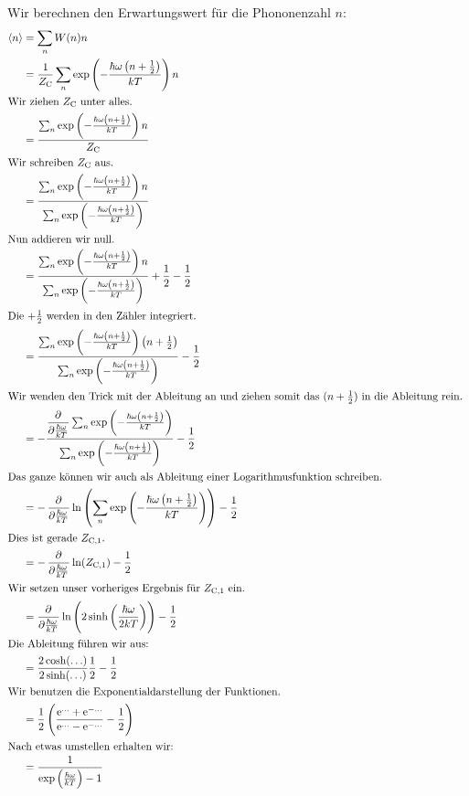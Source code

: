 Wir berechnen den Erwartungswert für die Phononenzahl $n$:
\begin{align*}
    \bracket n
    &= \sum_n W(n) n \\
    &= \frac1\ZC \sum_n \exp\del{-\frac{\hbar \omega \del{n + \frac12}}{kT}} n \\
    \intertext{%
        Wir ziehen $\ZC$ unter alles.
    }
    &= \frac{\sum_n \exp\del{-\frac{\hbar \omega \del{n + \frac12}}{kT}} n}{\ZC} \\
    \intertext{%
        Wir schreiben $\ZC$ aus.
    }
    &= \frac{\sum_n \exp\del{-\frac{\hbar \omega \del{n + \frac12}}{kT}} n}{\sum_n \exp\del{-\frac{\hbar \omega \del{n + \frac12}}{kT}}} \\
    \intertext{%
        Nun addieren wir null.
    }
    &= \frac{\sum_n \exp\del{-\frac{\hbar \omega \del{n + \frac12}}{kT}} n}{\sum_n \exp\del{-\frac{\hbar \omega \del{n + \frac12}}{kT}}} + \frac12 - \frac12 \\
    \intertext{%
        Die $+\frac 12$ werden in den Zähler integriert.
    }
    &= \frac{\sum_n \exp\del{-\frac{\hbar \omega \del{n + \frac12}}{kT}} \del{n + \frac12}}{\sum_n \exp\del{-\frac{\hbar \omega \del{n + \frac12}}{kT}}} - \frac12 \\
    \intertext{%
        Wir wenden den Trick mit der Ableitung an und ziehen somit das $(n +
        \frac 12)$ in die Ableitung rein.
    }
    &= - \frac{\dpd{}{\frac{\hbar\omega}{kT}} \sum_n \exp\del{-\frac{\hbar \omega \del{n + \frac12} }{kT}}}{\sum_n \exp\del{-\frac{\hbar \omega \del{n + \frac12}}{kT}}} - \frac12 \\
    \intertext{%
        Das ganze können wir auch als Ableitung einer Logarithmusfunktion
        schreiben.
    }
    &= - \dpd{}{\frac{\hbar\omega}{kT}} \ln\del{\sum_n \exp\del{-\frac{\hbar \omega \del{n + \frac12}}{kT}}} - \frac12 \\
    \intertext{%
        Dies ist gerade $Z_{\text C,1}$.
    }
    &= -\dpd{}{\frac{\hbar\omega}{kT}} \ln(Z_{\text C,1}) - \frac12 \\
    \intertext{%
        Wir setzen unser vorheriges Ergebnis für $Z_{\text C,1}$ ein.
    }
    &= \dpd{}{\frac{\hbar\omega}{kT}} \ln\del{2 \sinh\del{\frac{\hbar\omega}{2kT}}} - \frac12 \\
    \intertext{%
        Die Ableitung führen wir aus:
    }
    &= \frac{2 \cosh(\ldots)}{2 \sinh(\ldots)} \frac 12 - \frac 12 \\
    \intertext{%
        Wir benutzen die Exponentialdarstellung der Funktionen.
    }
    &= \frac 12\del{\frac{\eup^{\ldots} + \eup^{-\ldots}}{\eup^{\ldots} - \eup^{-\ldots}} - \frac 12} \\
    \intertext{%
        Nach etwas umstellen erhalten wir:
    }
    &= \frac1{\exp\del{\frac{\hbar\omega}{kT}} - 1}
\end{align*}

